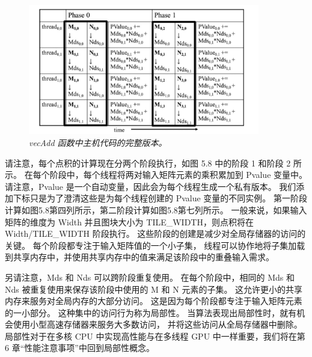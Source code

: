 \begin{figure}[H]
	\centering
	\includegraphics[width=0.9\textwidth]{figs/F5.8.png}
	\caption{\textit{\color{red} vecAdd 函数中主机代码的完整版本。}}
\end{figure}

请注意，每个点积的计算现在分两个阶段执行，如图 5.8 中的阶段 1 和阶段 2 所示。 
在每个阶段中，每个线程将两对输入矩阵元素的乘积累加到 Pvalue 变量中。 
请注意，Pvalue 是一个自动变量，因此会为每个线程生成一个私有版本。 
我们添加下标只是为了澄清这些是为每个线程创建的 Pvalue 变量的不同实例。 
第一阶段计算如图5.8第四列所示，第二阶段计算如图5.8第七列所示。 
一般来说，如果输入矩阵的维度为 Width 并且图块大小为 TILE\_WIDTH，则点积将在 Width/TILE\_WIDTH 阶段执行。 
这些阶段的创建是减少对全局存储器的访问的关键。 每个阶段都专注于输入矩阵值的一个小子集，
线程可以协作地将子集加载到共享内存中，并使用共享内存中的值来满足该阶段中的重叠输入需求。

另请注意，Mds 和 Nds 可以跨阶段重复使用。 
在每个阶段中，相同的 Mds 和 Nds 被重复使用来保存该阶段中使用的 M 和 N 元素的子集。 
这允许更小的共享内存来服务对全局内存的大部分访问。 这是因为每个阶段都专注于输入矩阵元素的一小部分。 
这种集中的访问行为称为局部性。 当算法表现出局部性时，就有机会使用小型高速存储器来服务大多数访问，
并将这些访问从全局存储器中删除。 
局部性对于在多核 CPU 中实现高性能与在多线程 GPU 中一样重要，我们将在第 6 章“性能注意事项”中回到局部性概念。

